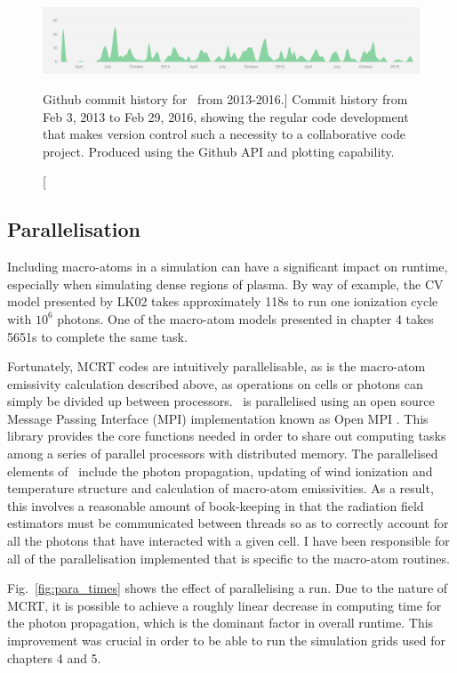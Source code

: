 \begin{figure}
\centering
\includegraphics[width=1.0\textwidth]{figures/03-radtrans/github1.png}
\caption
[Github commit history for \py\ from 2013-2016.]
{
Commit history from Feb 3, 2013 to Feb 29, 2016, showing the regular code development
that makes version control such a necessity to a collaborative code project. Produced
using the Github API and plotting capability.
} 
\label{fig:github}
\end{figure}

\subsection{Parallelisation} 
\label{sec:parallel}

Including macro-atoms in a simulation can have a significant impact 
on runtime, especially when simulating dense regions of plasma. 
By way of example, the CV model presented by LK02 takes approximately
118s to run one ionization cycle with $10^6$ photons. One of the macro-atom 
models presented in chapter 4 takes 5651s to complete the same task. 

Fortunately, MCRT codes are intuitively parallelisable, as is the macro-atom
emissivity calculation described above, as operations on cells or photons can
simply be divided up between processors. \py\ is parallelised using an open 
source Message Passing Interface (MPI) implementation known as 
Open MPI \citep{openmpi}. This library provides the core functions needed
in order to share out computing tasks among a series of parallel processors
with distributed memory. The parallelised elements of \py\ include
the photon propagation, updating of wind ionization and temperature structure
and calculation of macro-atom emissivities. As a result, this involves
a reasonable amount of book-keeping in that the radiation field estimators 
must be communicated between threads so as to correctly account for all
the photons that have interacted with a given cell. I have been responsible
for all of the parallelisation implemented that is
specific to the macro-atom routines.

Fig.~\ref{fig:para_times} shows the effect of parallelising a run. Due to the nature of MCRT,
it is possible to achieve a roughly linear decrease in computing time
for the photon propagation, which is the dominant factor in overall 
runtime. This improvement was crucial in order to be able to run the simulation
grids used for chapters 4 and 5.



